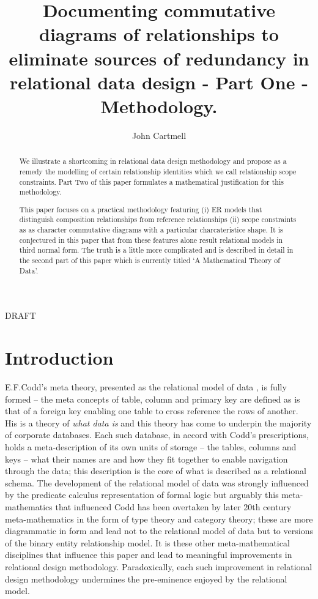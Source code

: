 \documentclass[10pt,a4paper]{article}
\begin{document}
\title{Documenting commutative diagrams of relationships to eliminate sources of redundancy in relational data design - Part One - Methodology.}


\author{John Cartmell}

\maketitle
\begin{center}
DRAFT
\end{center}

\begin{abstract}
\noindent We illustrate a shortcoming in relational data design methodology and propose 
as a remedy the modelling
of certain relationship identities which we call relationship scope constraints.  
Part Two of this paper formulates a mathematical justification for this methodology.

This paper focuses on a practical methodology featuring (i) ER models that distinguish composition relationships from reference relationships (ii) scope constraints as as character commutative diagrams with a particular charcateristice shape. It is conjectured in this paper that from these features alone result
relational models in third normal form. The truth is a little more complicated and is described in detail in the second part of this paper which is
currently titled `A Mathematical Theory of Data'.
\end{abstract}

% 
\section{Introduction}

E.F.Codd's meta theory, presented as the relational model of data \cite{Codd1970}, is fully formed -- the meta concepts of table, column and primary key are defined as is that of a foreign key enabling one table to cross reference the rows of another. 
His is a theory of \textit{what data is} and this theory has come to underpin the majority of corporate databases.  
Each such database, in accord with Codd's prescriptions, holds a meta-description of its own units of storage -- the tables, columns and keys -- what their names are and how they fit together to enable navigation through the data; this description is the core of what is described as a relational schema. The development of the relational model of data was strongly influenced by the predicate calculus representation of formal logic but arguably 
this meta-mathematics that influenced Codd has been overtaken by  later 20th century meta-mathematics in the form of type theory and category theory; these are more diagrammatic in form and lead not to the relational model of data but to versions of the binary entity relationship model. It is these other meta-mathematical disciplines that influence this paper and lead to meaningful improvements in relational design methodology. Paradoxically, each such improvement in relational design methodology undermines the pre-eminence enjoyed by the relational model.\\
\end{document}

